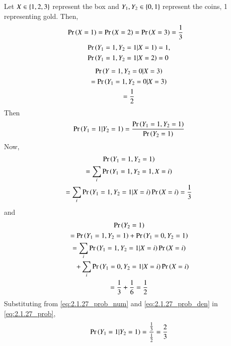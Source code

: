 Let $X \in \left\{1,2,3\right\}$ represent the box and $Y_1,Y_2 \in \left\{0,1\right\}$ represent the coins, 1 representing gold.  Then,
\begin{align}
\Pr\left(X = 1\right)&=
\Pr\left(X = 2\right)=
\Pr\left(X = 3\right)= \frac{1}{3}
\end{align}
\begin{align}
\Pr\left(Y_1 = 1, Y_2 = 1|X=1\right) &= 1,
\\
\Pr\left(Y_1 = 1, Y_2 = 1|X=2\right) &= 0
\end{align}
\begin{multline}
\Pr\left(Y = 1, Y_2 = 0|X=3\right) 
\\
= \Pr\left(Y_1 = 1, Y_2 = 0|X=3\right) 
\\
= \frac{1}{2}
\end{multline}
Then
\begin{align}
\Pr\left(Y_1=1|Y_2 = 1\right) = \frac{\Pr\left(Y_1=1,Y_2=1\right)}{\Pr\left(Y_2=1\right)}
\label{eq:2.1.27_prob}
\end{align}
Now,
\begin{multline}
\Pr\left(Y_1=1,Y_2 = 1\right) 
\\
= \sum_{i}\Pr\left(Y_1=1,Y_2 = 1,X = i\right)
\\
= \sum_{i}\Pr\left(Y_1=1,Y_2 = 1|X = i\right)\Pr\left(X = i\right) = \frac{1}{3}
\label{eq:2.1.27_prob_num}
\end{multline}
and
\begin{multline}
\Pr\left(Y_2 = 1\right) 
\\
= \Pr\left(Y_1=1,Y_2 = 1\right)+ \Pr\left(Y_1=0,Y_2 = 1\right)
\\
= \sum_{i}\Pr\left(Y_1=1,Y_2 = 1|X = i\right)\Pr\left(X = i\right) 
\\
\quad + \sum_{i}\Pr\left(Y_1=0,Y_2 = 1|X = i\right)\Pr\left(X = i\right) 
\\
= \frac{1}{3}+\frac{1}{6} = \frac{1}{2}
\label{eq:2.1.27_prob_den}
\end{multline}
Substituting from \eqref{eq:2.1.27_prob_num}
and \eqref{eq:2.1.27_prob_den}
in \eqref{eq:2.1.27_prob},
\begin{align}
\Pr\left(Y_1=1|Y_2 = 1\right) = \frac{\frac{1}{3}}{\frac{1}{2}} = \frac{2}{3}
\label{eq:2.1.27_prob_sol}
\end{align}

